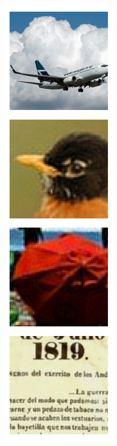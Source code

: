\documentclass{article} %
\begin{document}
\begin{figure}[h]
\begin{subfigure}[t]{0.16\columnwidth}
\label{fig:manipulation-projection}
\end{subfigure}
\begin{subfigure}[t]{0.16\columnwidth}
\includegraphics[width=1\columnwidth]{figures/latents/pca.png}\caption{}

\end{subfigure}
\end{figure}
\end{document}
